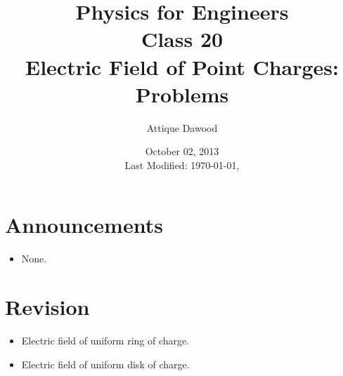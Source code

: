\documentclass[12pt,a4paper]{article}
\title{\vspace{-3cm}Physics for Engineers\\Class 20\\Electric Field of Point Charges: Problems}
\author{Attique Dawood}
\date{October 02, 2013\\[0.2cm] Last Modified: \today, \currenttime}
\begin{document}
\maketitle
\section{Announcements}
\begin{itemize}
\item None.
\end{itemize}
\section{Revision}
\begin{itemize}
\item Electric field of uniform ring of charge.
\item Electric field of uniform disk of charge.
\end{itemize}
\end{document}
